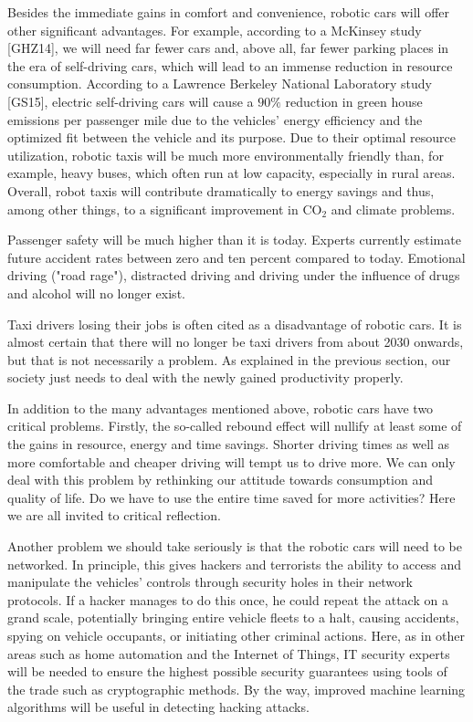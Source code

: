 \documentclass[10pt]{book}
\begin{document}
Besides the immediate gains in comfort and convenience, robotic cars will offer other significant advantages. For example, according to a McKinsey study [GHZ14], we will need far fewer cars and, above all, far fewer parking places in the era of self-driving cars, which will lead to an immense reduction in resource consumption. According to a Lawrence Berkeley National Laboratory study [GS15], electric self-driving cars will cause a $90 \%$ reduction in green house emissions per passenger mile due to the vehicles' energy efficiency and the optimized fit between the vehicle and its purpose. Due to their optimal resource utilization, robotic taxis will be much more environmentally friendly than, for example, heavy buses, which often run at low capacity, especially in rural areas. Overall, robot taxis will contribute dramatically to energy savings and thus, among other things, to a significant improvement in $\mathrm{CO}_{2}$ and climate problems.

Passenger safety will be much higher than it is today. Experts currently estimate future accident rates between zero and ten percent compared to today. Emotional driving ("road rage"), distracted driving and driving under the influence of drugs and alcohol will no longer exist.

Taxi drivers losing their jobs is often cited as a disadvantage of robotic cars. It is almost certain that there will no longer be taxi drivers from about 2030 onwards, but that is not necessarily a problem. As explained in the previous section, our society just needs to deal with the newly gained productivity properly.

In addition to the many advantages mentioned above, robotic cars have two critical problems. Firstly, the so-called rebound effect will nullify at least some of the gains in resource, energy and time savings. Shorter driving times as well as more comfortable and cheaper driving will tempt us to drive more. We can only deal with this problem by rethinking our attitude towards consumption and quality of life. Do we have to use the entire time saved for more activities? Here we are all invited to critical reflection.

Another problem we should take seriously is that the robotic cars will need to be networked. In principle, this gives hackers and terrorists the ability to access and manipulate the vehicles' controls through security holes in their network protocols. If a hacker manages to do this once, he could repeat the attack on a grand scale, potentially bringing entire vehicle fleets to a halt, causing accidents, spying on vehicle occupants, or initiating other criminal actions. Here, as in other areas such as home automation and the Internet of Things, IT security experts will be needed to ensure the highest possible security guarantees using tools of the trade such as cryptographic methods. By the way, improved machine learning algorithms will be useful in detecting hacking attacks.
\end{document}
